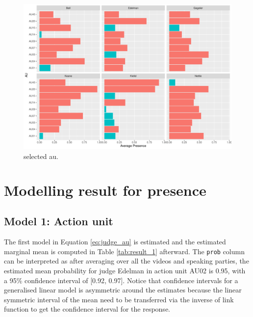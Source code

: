 \documentclass{monashthesis}
\begin{document}
\begin{figure}

{\centering \includegraphics[width=1\linewidth]{figures/selected-au-intensity-1} 

}

\caption{selected au.}\label{fig:selected-au-intensity}
\end{figure}

\newpage

\hypertarget{modelling-result-for-presence}{%
\section{Modelling result for presence}\label{modelling-result-for-presence}}

\hypertarget{model-1-action-unit-1}{%
\subsection{Model 1: Action unit}\label{model-1-action-unit-1}}

The first model in Equation \ref{eq:judge_au} is estimated and the estimated marginal mean is computed in Table \ref{tab:result_1} afterward. The \texttt{prob} column can be interpreted as after averaging over all the videos and speaking parties, the estimated mean probability for judge Edelman in action unit AU02 is 0.95, with a 95\% confidence interval of {[}0.92, 0.97{]}. Notice that confidence intervals for a generalised linear model is asymmetric around the estimates because the linear symmetric interval of the mean need to be transferred via the inverse of link function to get the confidence interval for the response.
\end{document}
